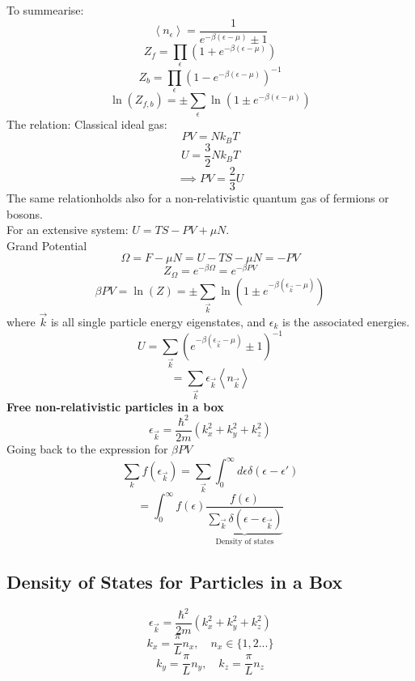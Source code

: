 \documentclass[11pt]{book}
\theoremstyle{definition}
\begin{document}
To summearise:
\[ \left \langle n_{\epsilon} \right \rangle = \frac{1}{e^{-\beta(\epsilon-\mu)}\pm 1} \] 
\[ Z_f = \prod_{\epsilon} (1+e^{-\beta(\epsilon-\mu)}) \] 
\[ Z_b = \prod_{\epsilon} (1-e^{-\beta(\epsilon-\mu)})^{-1} \] 
\[ \ln(Z_{f,b})  = \pm \sum_{\epsilon} \ln(1\pm e^{-\beta(\epsilon-\mu)}) \] 
The relation:
Classical ideal gas:
\[ PV=Nk_BT \] 
\[ U = \frac{3}{2}Nk_BT \] 
\[ \implies PV = \frac{2}{3}U \] 
The same relationholds also for a non-relativistic quantum gas of fermions or bosons. \\
For an extensive system: $ U = TS-PV+\mu N $. \\
Grand Potential \[ \Omega = F - \mu N = U -TS -\mu N = -PV \] 
\[ Z_{\Omega} = e^{-\beta \Omega} = e^{-\beta PV}\] 
\[ \beta PV = \ln(Z) = \pm \sum_{\vec{k}} \ln(1\pm e^{-\beta(\epsilon_{\vec{k}} - \mu)}) \] 
where $ \vec{k} $ is all single particle energy eigenstates, and $ \epsilon_k $ is the associated energies. \\
\[ U = \sum_{\vec{k}} {(e^{-\beta(\epsilon_{\vec{k}}-\mu)}\pm 1)}^{-1} \] 
\[ = \sum_{\vec{k}} \epsilon_{\vec{k}} \left \langle n_{\vec{k}} \right \rangle  \] 
\textbf{Free non-relativistic particles in a box} 
\[ \epsilon_{\vec{k}} = \frac{\hbar^2}{2m} (k_x^2+k_y^2+k_z^2) \] 
Going back to the expression for $ \beta PV $ 
\[ \sum_k f(\epsilon_{\vec{k}}) = \sum_{\vec{k}} \int_{0}^{\infty} d\epsilon \delta( \epsilon - \epsilon' )\] 
\[ = \int_{0}^{\infty} f(\epsilon) \frac{f(\epsilon)}{
\underbrace{\sum_{\vec{k}} \delta( \epsilon - \epsilon_{\vec{k}} )}_{\text{Density of states}}}\] 
\subsection{Density of States for Particles in a Box}
\[ \epsilon_{\vec{k}} = \frac{\hbar^2}{2m} (k_x^2+k_y^2+k_z^2)\] 
\[ k_x  = \frac{\pi}{L}n_x, \quad n_x \in \{1,2... \} \] 
\[ k_y = \frac{\pi}{L}n_y, \quad k_z = \frac{\pi}{L}n_z \] 
\end{document}
